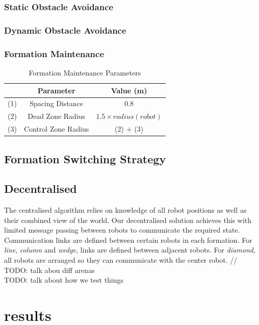 \documentclass[letterpaper, 10 pt, conference]{ieeeconf}  %
\begin{document}
\subsubsection*{Static Obstacle Avoidance}
\subsubsection*{Dynamic Obstacle Avoidance}
\subsubsection*{Formation Maintenance}
\begin{table}[h]
\label{table_formation}
\begin{center}
\begin{tabular}{|c || c||c |}
\hline
 & Parameter & Value (m)\\
\hline
(1) & Spacing Distance            & 0.8 \\
(2) & Dead Zone Radius            & $1.5 \times radius(robot)$\\
(3) & Control Zone Radius         & (2) $+$ (3) \\
\hline
\end{tabular}
\end{center}
\caption{Formation Maintenance Parameters}
\end{table}

\subsection{Formation Switching Strategy}
\subsection{Decentralised}
The centralised algorithm relies on knowledge of all robot positions as well as their combined view of the world. Our decentralised solution achieves this with limited message passing between robots to communicate the required state. Communication links are defined between certain robots in each formation. For \textit{line}, \textit{column} and \textit{wedge}, links are defined between adjacent robots. For \textit{diamond}, all robots are arranged so they can communicate with the center robot.  
//
TODO: talk abou diff arenas \\
TODO: talk about how we test things

\section{results}
\end{document}
